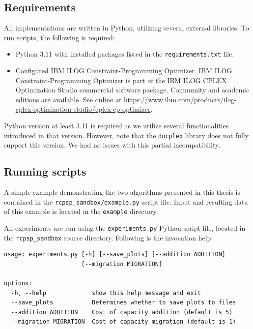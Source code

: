 \subsection{Requirements}

All implementations are written in Python, utilizing several external libraries.
To run scripts, the following is required:

\begin{itemize}
    \item Python 3.11 with installed packages listed in the \texttt{requirements.txt} file.

    \item Configured IBM ILOG Constraint-Programming Optimizer.
        IBM ILOG Constraint-Programming Optimizer is part of the IBM ILOG CPLEX Optimization Studio
        commercial software package.
        Community and academic editions are available.
        See online at \url{https://www.ibm.com/products/ilog-cplex-optimization-studio/cplex-cp-optimizer}.
\end{itemize}

Python version at least 3.11 is required as we utilize several functionalities introduced in that version.
However, note that the \texttt{docplex} library does not fully support this version.
We had no issues with this partial incompatibility.

\subsection{Running scripts}

A simple example demonstrating the two algorithms presented in this thesis
is contained in the \texttt{rcpsp\_sandbox/example.py} script file.
Input and resulting data of this example is located in the \texttt{example} directory.

All experiments are run using the \texttt{experiments.py} Python script file,
located in the \texttt{rcpsp\_sandbox} source directory.
Following is the invocation help:

\begin{small}
\begin{verbatim}
usage: experiments.py [-h] [--save_plots] [--addition ADDITION]
                      [--migration MIGRATION]

options:
  -h, --help             show this help message and exit
  --save_plots           Determines whether to save plots to files
  --addition ADDITION    Cost of capacity addition (default is 5)
  --migration MIGRATION  Cost of capacity migration (default is 1)
\end{verbatim}
\end{small}

